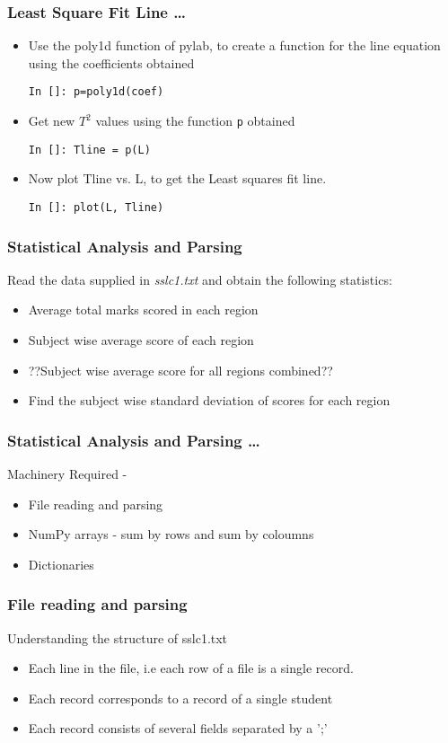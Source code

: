 \documentclass[14pt,compress]{beamer}
\newcommand{\typ}[1]{\lstinline{#1}}
\begin{document}
\begin{frame}[fragile]
\frametitle{Least Square Fit Line \ldots}
\begin{itemize}
\item Use the poly1d function of pylab, to create a function for the line equation using the coefficients obtained
\begin{lstlisting}
In []: p=poly1d(coef)
\end{lstlisting}
\item Get new $T^2$ values using the function \typ{p} obtained
\begin{lstlisting}
In []: Tline = p(L)
\end{lstlisting}
\item Now plot Tline vs. L, to get the Least squares fit line. 
\begin{lstlisting}
In []: plot(L, Tline)
\end{lstlisting}
\end{itemize}
\end{frame}

\begin{frame}
  \frametitle{Statistical Analysis and Parsing}
  Read the data supplied in \emph{sslc1.txt} and obtain the following statistics:
  \begin{itemize}
    \item Average total marks scored in each region
    \item Subject wise average score of each region
    \item \alert{??Subject wise average score for all regions combined??}
    \item Find the subject wise standard deviation of scores for each region
  \end{itemize}
\end{frame}

\begin{frame}
  \frametitle{Statistical Analysis and Parsing \ldots}
  Machinery Required -
  \begin{itemize}
    \item File reading and parsing
    \item NumPy arrays - sum by rows and sum by coloumns
    \item Dictionaries
  \end{itemize}
\end{frame}

\begin{frame}
  \frametitle{File reading and parsing}
  Understanding the structure of sslc1.txt
  \begin{itemize}
    \item Each line in the file, i.e each row of a file is a single record.
    \item Each record corresponds to a record of a single student
    \item Each record consists of several fields separated by a ';'
  \end{itemize}
\end{frame}
\end{document}
